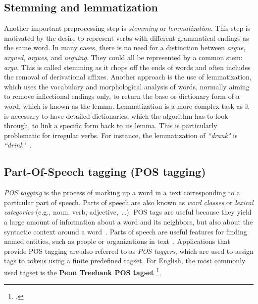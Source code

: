 \subsection{Stemming and  lemmatization}\label{subsec:steming}
Another important preprocessing step is \emph{stemming} or \emph{lemmatization}. This step is motivated by the desire to represent verbs with different grammatical endings as the same word.
In many cases, there is no need for a distinction between \emph{argue}, \emph{argued}, \emph{argues}, and \emph{arguing}. They could all be represented by a common stem: \emph{argu}. This is called stemming as it chops off the ends of words and often includes the removal of derivational affixes. Another approach is the use of lemmatization, which uses the vocabulary and morphological analysis of words, normally aiming to remove inflectional endings only, to return the base or dictionary form of a word, which is known as the lemma. Lemmatization is a more complex task as it is necessary to have detailed dictionaries, which the algorithm has to look through, to link a specific form back to its lemma. This is particularly problematic for irregular verbs. For instance,
the lemmatization of \emph{``drank"} is \emph{``drink"}~.

\subsection{Part-Of-Speech tagging (POS tagging)}\label{subsec:pos}
\emph{POS tagging} is the process of marking up a word in a text corresponding to a particular part of speech. Parts of speech are also known as \emph{word classes} or \emph{lexical categories} (e.g., noun, verb, adjective,~\dots). POS tags are useful because they yield a large amount of information about a word and its neighbors, but also about the syntactic context around a word~. Parts of speech are useful features for finding named entities, such as people or organizations in text~. Applications that provide POS tagging are also referred to as \emph{POS taggers}, which are used to assign tags to tokens using a finite predefined tagset. For English, the most commonly used tagset is the \textbf{Penn Treebank POS tagset} \footcite{https://www.ling.upenn.edu/courses/Fall_2003/ling001/penn_treebank_pos.html}. 

